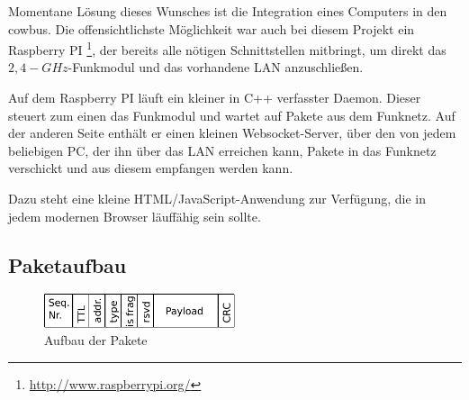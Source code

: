 \documentclass{IEEEtran}
\begin{document}
            Momentane Lösung dieses Wunsches ist die Integration eines Computers
            in den cowbus. Die offensichtlichste Möglichkeit war auch bei diesem
            Projekt ein Raspberry PI \footnote{\url{http://www.raspberrypi.org/}},
            der bereits alle nötigen Schnittstellen mitbringt, um direkt das
            $2,4-GHz$-Funkmodul und das vorhandene \ac{LAN} anzuschließen.

            Auf dem Raspberry PI läuft ein kleiner in C++ verfasster Daemon.
            Dieser steuert zum einen das Funkmodul und wartet auf Pakete aus
            dem Funknetz.
            Auf der anderen Seite enthält er einen kleinen Websocket-Server,
            über den von jedem beliebigen PC, der ihn über das \ac{LAN}
            erreichen kann, Pakete in das Funknetz verschickt und aus diesem
            empfangen werden kann.

            Dazu steht eine kleine HTML/JavaScript-Anwendung zur Verfügung,
            die in jedem modernen Browser läuffähig sein sollte.


    
    \subsection{Paketaufbau}
            \begin{figure}
            \centering
            \includegraphics[width=0.5\textwidth]{img/paket}
            \caption{Aufbau der Pakete}
            \label{fig:paket}
        \end{figure}
\end{document}
